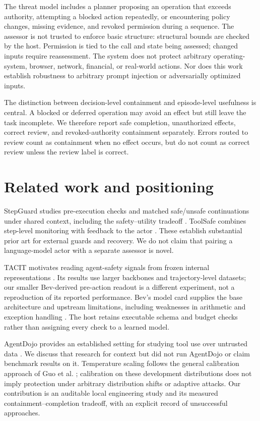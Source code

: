 \documentclass[11pt]{article}
\begin{document}
The threat model includes a planner proposing an operation that exceeds authority, attempting a blocked action repeatedly, or encountering policy changes, missing evidence, and revoked permission during a sequence. The assessor is not trusted to enforce basic structure: structural bounds are checked by the host. Permission is tied to the call and state being assessed; changed inputs require reassessment. The system does not protect arbitrary operating-system, browser, network, financial, or real-world actions. Nor does this work establish robustness to arbitrary prompt injection or adversarially optimized inputs.

The distinction between decision-level containment and episode-level usefulness is central. A blocked or deferred operation may avoid an effect but still leave the task incomplete. We therefore report safe completion, unauthorized effects, correct review, and revoked-authority containment separately. Errors routed to review count as containment when no effect occurs, but do not count as correct review unless the review label is correct.

\section{Related work and positioning}
StepGuard studies pre-execution checks and matched safe/unsafe continuations under shared context, including the safety--utility tradeoff \cite{stepguard}. ToolSafe combines step-level monitoring with feedback to the actor \cite{toolsafe}. These establish substantial prior art for external guards and recovery. We do not claim that pairing a language-model actor with a separate assessor is novel.

TACIT motivates reading agent-safety signals from frozen internal representations \cite{agentwithin}. Its results use larger backbones and trajectory-level datasets; our smaller Bev-derived pre-action readout is a different experiment, not a reproduction of its reported performance. Bev's model card supplies the base architecture and upstream limitations, including weaknesses in arithmetic and exception handling \cite{bev}. The host retains executable schema and budget checks rather than assigning every check to a learned model.

AgentDojo provides an established setting for studying tool use over untrusted data \cite{agentdojo}. We discuss that research for context but did not run AgentDojo or claim benchmark results on it. Temperature scaling follows the general calibration approach of Guo et al. \cite{guo}; calibration on these development distributions does not imply protection under arbitrary distribution shifts or adaptive attacks. Our contribution is an auditable local engineering study and its measured containment--completion tradeoff, with an explicit record of unsuccessful approaches.
\end{document}
